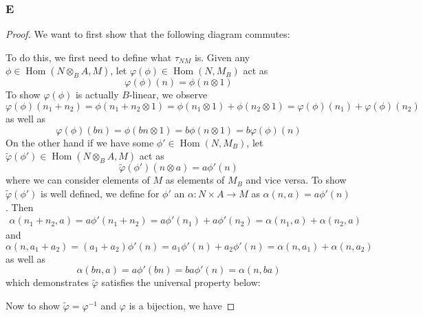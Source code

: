 \documentclass{article}
\DeclareMathOperator{\Hom}{Hom}
\begin{document}
\subsubsection{E}\label{1.5.E}
\begin{proof}
    We want to first show that the following diagram commutes:
    \begin{center}
    \end{center}
    To do this, we first need to define what $\tau_{NM}$ is. Given any $\phi \in \Hom(N\otimes_B A,M)$, let $\varphi(\phi)\in \Hom(N,M_B)$ act as
    \[
    \varphi(\phi)(n)=\phi(n\otimes 1)
    \]
    To show $\varphi(\phi)$ is actually $B$-linear, we observe
    \[
    \varphi(\phi)(n_1+n_2)=\phi(n_1+n_2\otimes 1)=\phi(n_1\otimes 1)+\phi(n_2\otimes 1)=\varphi(\phi)(n_1)+\varphi(\phi)(n_2)
    \]
    as well as
    \[
    \varphi(\phi)(bn)=\phi(bn\otimes 1)=b\phi(n\otimes 1)=b\varphi(\phi)(n)
    \]
    On the other hand if we have some $\phi'\in \Hom(N,M_B)$, let $\tilde \varphi(\phi')\in \Hom(N\otimes_BA,M)$ act as
    \[
    \tilde \varphi(\phi')(n\otimes a)=a \phi'(n)
    \]
    where we can consider elements of $M$ as elements of $M_B$ and vice versa. To show $\tilde \varphi(\phi')$ is well defined, we define for $\phi'$ an $\alpha:N\times A\to M$ as $\alpha(n,a)=a\phi'(n)$. Then
    \begin{align*}
        \alpha(n_1+n_2,a)=a \phi'(n_1+n_2)=a\phi'(n_1)+a \phi'(n_2)=\alpha(n_1,a)+\alpha(n_2,a)
    \end{align*}
    and
    \[
    \alpha(n,a_1+a_2)=(a_1+a_2)\phi'(n)=a_1 \phi'(n)+a_2 \phi'(n)=\alpha(n,a_1)+\alpha(n,a_2)
    \]
    as well as
    \[
    \alpha(bn,a)=a\phi'(bn)=ba\phi'(n)=\alpha(n,ba)
    \]
    which demonstrates $\tilde \varphi$ satisfies the universal property below:
    \begin{center}
    \end{center}
    Now to show $\tilde \varphi=\varphi^{-1}$ and $\varphi$ is a bijection, we have

\end{proof}
\end{document}
